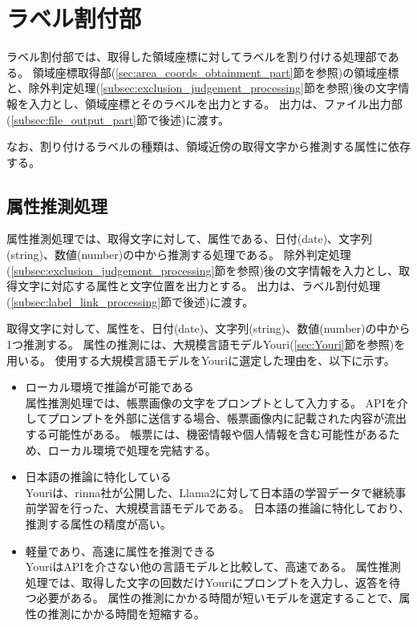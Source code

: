 \section{ラベル割付部}\label{sec:label_link_part}
ラベル割付部では、取得した領域座標に対してラベルを割り付ける処理部である。
領域座標取得部(\ref{sec:area_coords_obtainment_part}節を参照)の領域座標と、除外判定処理(\ref{subsec:exclusion_judgement_processing}節を参照)後の文字情報を入力とし、領域座標とそのラベルを出力とする。
出力は、ファイル出力部(\ref{subsec:file_output_part}節で後述)に渡す。

なお、割り付けるラベルの種類は、領域近傍の取得文字から推測する属性に依存する。

\subsection{属性推測処理}\label{subsec:att_prediction_processing}
属性推測処理では、取得文字に対して、属性である、日付(date)、文字列(string)、数値(number)の中から推測する処理である。
除外判定処理(\ref{subsec:exclusion_judgement_processing}節を参照)後の文字情報を入力とし、取得文字に対応する属性と文字位置を出力とする。
出力は、ラベル割付処理(\ref{subsec:label_link_processing}節で後述)に渡す。

取得文字に対して、属性を、日付(date)、文字列(string)、数値(number)の中から1つ推測する。
属性の推測には、大規模言語モデルYouri(\ref{sec:Youri}節を参照)を用いる。
使用する大規模言語モデルをYouriに選定した理由を、以下に示す。

\begin{itemize}
    \item ローカル環境で推論が可能である\\
        属性推測処理では、帳票画像の文字をプロンプトとして入力する。
        APIを介してプロンプトを外部に送信する場合、帳票画像内に記載された内容が流出する可能性がある。
        帳票には、機密情報や個人情報を含む可能性があるため、ローカル環境で処理を完結する。
    \item 日本語の推論に特化している\\
        Youriは、rinna社が公開した、Llama2に対して日本語の学習データで継続事前学習を行った、大規模言語モデルである。
        日本語の推論に特化しており、推測する属性の精度が高い。
    \item 軽量であり、高速に属性を推測できる\\
        YouriはAPIを介さない他の言語モデルと比較して、高速である。
        属性推測処理では、取得した文字の回数だけYouriにプロンプトを入力し、返答を待つ必要がある。
        属性の推測にかかる時間が短いモデルを選定することで、属性の推測にかかる時間を短縮する。
\end{itemize}

